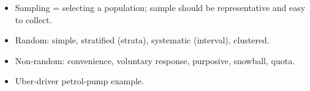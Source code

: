 \begin{QuickRevision}
\begin{itemize}
\item Sampling = selecting a population; sample should be representative and easy to collect.
\item Random: simple, stratified (strata), systematic (interval), clustered.
\item Non-random: convenience, voluntary response, purposive, snowball, quota.
\item Uber-driver petrol-pump example.
\end{itemize}
\end{QuickRevision}

